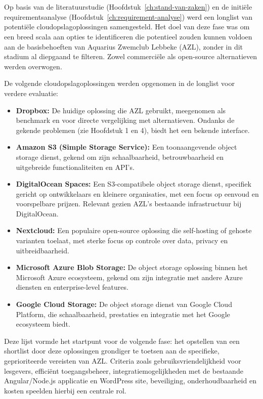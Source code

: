 \chapter{}
\label{ch:longlist}

Op basis van de literatuurstudie (Hoofdstuk~\ref{ch:stand-van-zaken}) en de initiële requirementsanalyse (Hoofdstuk~\ref{ch:requirement-analyse}) werd een longlist van potentiële cloudopslagoplossingen samengesteld. Het doel van deze fase was om een breed scala aan opties te identificeren die potentieel zouden kunnen voldoen aan de basisbehoeften van Aquarius Zwemclub Lebbeke (AZL), zonder in dit stadium al diepgaand te filteren. Zowel commerciële als open-source alternatieven werden overwogen.

De volgende cloudopslagoplossingen werden opgenomen in de longlist voor verdere evaluatie:

\begin{itemize}
    \item \textbf{Dropbox:} De huidige oplossing die AZL gebruikt, meegenomen als benchmark en voor directe vergelijking met alternatieven. Ondanks de gekende problemen (zie Hoofdstuk 1 en 4), biedt het een bekende interface.
    \item \textbf{Amazon S3 (Simple Storage Service):} Een toonaangevende object storage dienst, gekend om zijn schaalbaarheid, betrouwbaarheid en uitgebreide functionaliteiten en API's.
    \item \textbf{DigitalOcean Spaces:} Een S3-compatibele object storage dienst, specifiek gericht op ontwikkelaars en kleinere organisaties, met een focus op eenvoud en voorspelbare prijzen. Relevant gezien AZL's bestaande infrastructuur bij DigitalOcean.
    \item \textbf{Nextcloud:} Een populaire open-source oplossing die self-hosting of gehoste varianten toelaat, met sterke focus op controle over data, privacy en uitbreidbaarheid.
    \item \textbf{Microsoft Azure Blob Storage:} De object storage oplossing binnen het Microsoft Azure ecosysteem, gekend om zijn integratie met andere Azure diensten en enterprise-level features.
    \item \textbf{Google Cloud Storage:} De object storage dienst van Google Cloud Platform, die schaalbaarheid, prestaties en integratie met het Google ecosysteem biedt.
\end{itemize}

Deze lijst vormde het startpunt voor de volgende fase: het opstellen van een shortlist door deze oplossingen grondiger te toetsen aan de specifieke, geprioriteerde vereisten van AZL. Criteria zoals gebruiksvriendelijkheid voor lesgevers, efficiënt toegangsbeheer, integratiemogelijkheden met de bestaande Angular/Node.js applicatie en WordPress site, beveiliging, onderhoudbaarheid en kosten speelden hierbij een centrale rol.
